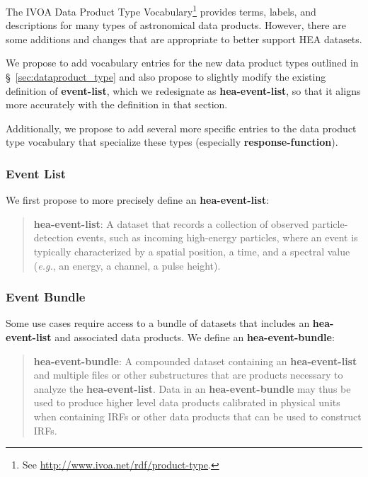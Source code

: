 \documentclass[11pt,a4paper]{ivoa}
\begin{document}
The \gls{IVOA} Data Product Type Vocabulary\footnote{See \url{http://www.ivoa.net/rdf/product-type}.} provides terms, labels, and descriptions for many types of astronomical data products. However, there are some additions and changes that are appropriate to better support \gls{HEA} datasets.

We propose to add vocabulary entries for the new data product types outlined in \S~\ref{sec:dataproduct_type} and also propose to slightly modify the existing definition of {\bf event-list}, which we redesignate as {\bf hea-event-list}, so that it aligns more accurately with the definition in that section.

 Additionally, we propose to add several more specific entries to the data product type vocabulary that specialize these types (especially {\bf response-function}).


\subsubsection{Event List}

We first propose to more precisely define an {\bf hea-event-list}:

\begin{quote}
{\bf hea-event-list}: A dataset that records a collection of observed particle-detection events, such as incoming high-energy particles, where an event is typically characterized by a spatial position, a time, and a spectral value ({\em e.g.\/}, an energy, a channel, a pulse height).
\end{quote}

\subsubsection{Event Bundle}

Some use cases require access to a bundle of datasets that includes an {\bf hea-event-list} and associated data products.  We define an {\bf hea-event-bundle}:

\begin{quote}
{\bf hea-event-bundle}: A compounded dataset containing an {\bf hea-event-list} and multiple files or other substructures that are products necessary to analyze the {\bf hea-event-list}. Data in an {\bf hea-event-bundle} may thus be used to produce higher level data products calibrated in physical units when containing \glspl{IRF} or other data products that can be used to construct \glspl{IRF}.
\end{quote}
\end{document}
